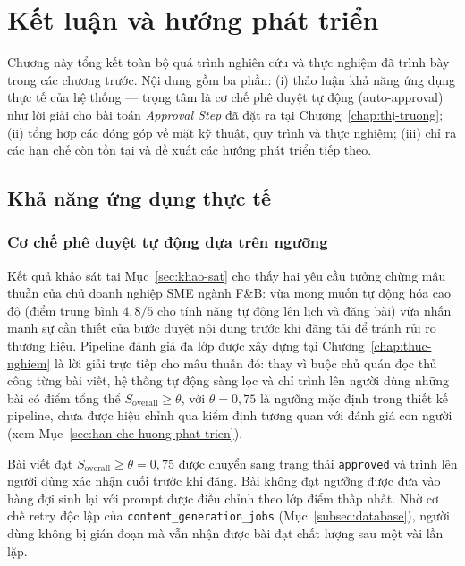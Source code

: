\chapter{Kết luận và hướng phát triển}\label{chap:ket-luan}

Chương này tổng kết toàn bộ quá trình nghiên cứu và thực nghiệm đã
trình bày trong các chương trước. Nội dung gồm ba phần: (i) thảo luận
khả năng ứng dụng thực tế của hệ thống --- trọng tâm là cơ chế phê
duyệt tự động (auto-approval) như lời giải cho bài toán
\emph{Approval Step} đã đặt ra tại Chương~\ref{chap:thị-truong};
(ii) tổng hợp các đóng góp về mặt kỹ thuật, quy trình và thực nghiệm;
(iii) chỉ ra các hạn chế còn tồn tại và đề xuất các hướng phát triển
tiếp theo.

\section{Khả năng ứng dụng thực tế}\label{sec:ung-dung}

\subsection{Cơ chế phê duyệt tự động dựa trên ngưỡng}

Kết quả khảo sát tại Mục~\ref{sec:khao-sat} cho thấy hai yêu cầu
tưởng chừng mâu thuẫn của chủ doanh nghiệp SME ngành F\&B: vừa mong
muốn tự động hóa cao độ (điểm trung bình $4{,}8/5$ cho tính năng tự
động lên lịch và đăng bài) vừa nhấn mạnh sự cần thiết của bước duyệt
nội dung trước khi đăng tải để tránh rủi ro thương hiệu. Pipeline
đánh giá đa lớp được xây dựng tại Chương~\ref{chap:thuc-nghiem} là
lời giải trực tiếp cho mâu thuẫn đó: thay vì buộc chủ quán đọc thủ
công từng bài viết, hệ thống tự động sàng lọc và chỉ trình lên người
dùng những bài có điểm tổng thể $S_{\text{overall}} \geq \theta$, với
$\theta = 0{,}75$ là ngưỡng mặc định trong thiết kế pipeline, chưa được hiệu chỉnh qua kiểm định tương quan với đánh giá con người (xem Mục~\ref{sec:han-che-huong-phat-trien}).

Bài viết đạt $S_{\text{overall}} \geq \theta = 0{,}75$ được chuyển
sang trạng thái \texttt{approved} và trình lên người dùng xác nhận
cuối trước khi đăng. Bài không đạt ngưỡng được đưa vào hàng đợi sinh
lại với prompt được điều chỉnh theo lớp điểm thấp nhất. Nhờ cơ chế
retry độc lập của \texttt{content\_generation\_jobs}
(Mục~\ref{subsec:database}), người dùng không bị gián đoạn mà vẫn
nhận được bài đạt chất lượng sau một vài lần lặp.

